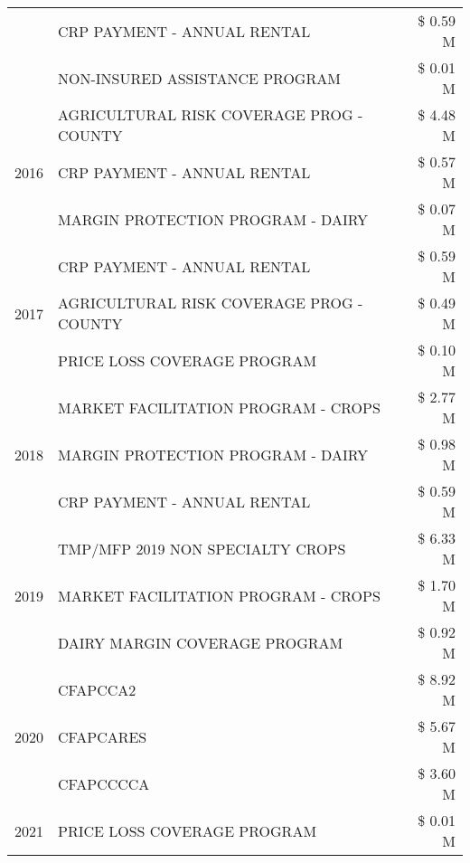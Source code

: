 \begin{tabular}{llr}
 & CRP PAYMENT - ANNUAL RENTAL & \$ 0.59 M \\
 & NON-INSURED ASSISTANCE PROGRAM & \$ 0.01 M \\
\cline{1-3}
\multirow[t]{3}{*}{2016} & AGRICULTURAL RISK COVERAGE PROG - COUNTY & \$ 4.48 M \\
 & CRP PAYMENT - ANNUAL RENTAL & \$ 0.57 M \\
 & MARGIN PROTECTION PROGRAM - DAIRY & \$ 0.07 M \\
\cline{1-3}
\multirow[t]{3}{*}{2017} & CRP PAYMENT - ANNUAL RENTAL & \$ 0.59 M \\
 & AGRICULTURAL RISK COVERAGE PROG - COUNTY & \$ 0.49 M \\
 & PRICE LOSS COVERAGE PROGRAM & \$ 0.10 M \\
\cline{1-3}
\multirow[t]{3}{*}{2018} & MARKET FACILITATION PROGRAM - CROPS & \$ 2.77 M \\
 & MARGIN PROTECTION PROGRAM - DAIRY & \$ 0.98 M \\
 & CRP PAYMENT - ANNUAL RENTAL & \$ 0.59 M \\
\cline{1-3}
\multirow[t]{3}{*}{2019} & TMP/MFP 2019 NON SPECIALTY CROPS & \$ 6.33 M \\
 & MARKET FACILITATION PROGRAM - CROPS & \$ 1.70 M \\
 & DAIRY MARGIN COVERAGE PROGRAM & \$ 0.92 M \\
\cline{1-3}
\multirow[t]{3}{*}{2020} & CFAPCCA2 & \$ 8.92 M \\
 & CFAPCARES & \$ 5.67 M \\
 & CFAPCCCCA & \$ 3.60 M \\
\cline{1-3}
2021 & PRICE LOSS COVERAGE PROGRAM & \$ 0.01 M \\
\cline{1-3}
\bottomrule
\end{tabular}
